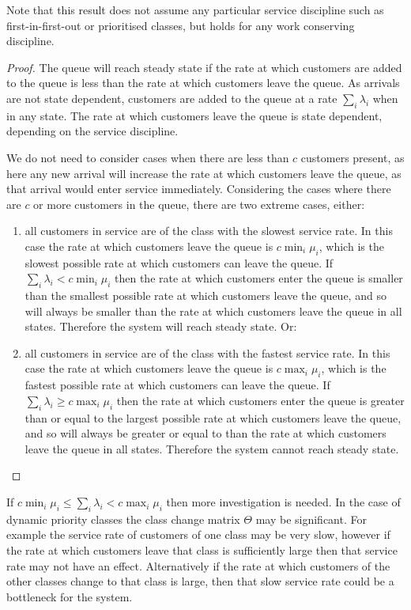 \documentclass{article}
\begin{document}
Note that this result does not assume any particular service discipline such as
first-in-first-out or prioritised classes, but holds for any work conserving
discipline.

\begin{proof}
The queue will reach steady state if the rate at which customers are added to
the queue is less than the rate at which customers leave the queue.
As arrivals are not state dependent, customers are added to the queue at a rate
$\sum_i \lambda_i$ when in any state.
The rate at which customers leave the queue is state dependent, depending on the
service discipline.

We do not need to consider cases when there are less than $c$ customers present,
as here any new arrival will increase the rate at which customers leave the
queue, as that arrival would enter service immediately.
Considering the cases where there are $c$ or more customers in the queue, there
are two extreme cases, either:

\begin{enumerate}
  \item all customers in service are of the class with the slowest service rate.
  In this case the rate at which customers leave the queue is $c \min_i \mu_i$,
  which is the slowest possible rate at which customers can leave the queue.
  If $\sum_i \lambda_i < c \min_i \mu_i$ then the rate at which customers enter
  the queue is smaller than the smallest possible rate at which customers leave
  the queue, and so will always be smaller than the rate at which customers
  leave the queue in all states. Therefore the system will reach steady state.
  Or:
  \item all customers in service are of the class with the fastest service rate.
  In this case the rate at which customers leave the queue is $c \max_i \mu_i$,
  which is the fastest possible rate at which customers can leave the queue.
  If $\sum_i \lambda_i \geq c \max_i \mu_i$ then the rate at which customers
  enter the queue is greater than or equal to the largest possible rate at which
  customers leave the queue, and so will always be greater or equal to than the
  rate at which customers leave the queue in all states. Therefore the system
  cannot reach steady state.
\end{enumerate}
\end{proof}

If $c \min_i \mu_i \leq \sum_i \lambda_i < c \max_i \mu_i$ then more
investigation is needed. In the case of dynamic priority classes the class
change matrix $\Theta$ may be significant. For example the service rate of
customers of one class may be very slow, however if the rate at which customers
leave that class is sufficiently large then that service rate may not have an
effect. Alternatively if the rate at which customers of the other classes change
to that class is large, then that slow service rate could be a bottleneck for
the system.
\end{document}
